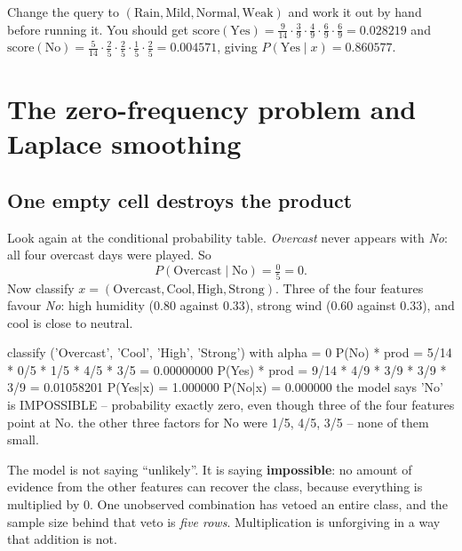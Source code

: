 \documentclass[11pt]{article}
\begin{document}
\begin{tryit}
Change the query to $(\text{Rain}, \text{Mild}, \text{Normal},
\text{Weak})$ and work it out by hand before running it. You should get
$\text{score}(\text{Yes}) = \tfrac{9}{14}\cdot\tfrac{3}{9}\cdot\tfrac{4}{9}
\cdot\tfrac{6}{9}\cdot\tfrac{6}{9} = 0.028219$ and
$\text{score}(\text{No}) = \tfrac{5}{14}\cdot\tfrac{2}{5}\cdot\tfrac{2}{5}
\cdot\tfrac{1}{5}\cdot\tfrac{2}{5} = 0.004571$, giving
$P(\text{Yes} \mid x) = 0.860577$.
\end{tryit}

\section{The zero-frequency problem and Laplace smoothing}
\label{sec:zero}

\subsection{One empty cell destroys the product}

Look again at the conditional probability table. \emph{Overcast} never
appears with \emph{No}: all four overcast days were played. So
\[
  P(\text{Overcast} \mid \text{No}) = \tfrac{0}{5} = 0 .
\]
Now classify $x = (\text{Overcast}, \text{Cool}, \text{High},
\text{Strong})$. Three of the four features favour \emph{No}: high humidity
($0.80$ against $0.33$), strong wind ($0.60$ against $0.33$), and cool is
close to neutral.

\begin{codeout}
classify ('Overcast', 'Cool', 'High', 'Strong') with alpha = 0
      P(No) * prod = 5/14 * 0/5 * 1/5 * 4/5 * 3/5 = 0.00000000
      P(Yes) * prod = 9/14 * 4/9 * 3/9 * 3/9 * 3/9 = 0.01058201
      P(Yes|x) = 1.000000   P(No|x) = 0.000000
      the model says 'No' is IMPOSSIBLE -- probability exactly zero,
      even though three of the four features point at No.
      the other three factors for No were 1/5, 4/5, 3/5 -- none of them small.
\end{codeout}

\begin{caution}
The model is not saying ``unlikely''. It is saying \textbf{impossible}: no
amount of evidence from the other features can recover the class, because
everything is multiplied by $0$. One unobserved combination has vetoed an
entire class, and the sample size behind that veto is \emph{five rows}.
Multiplication is unforgiving in a way that addition is not.
\end{caution}
\end{document}
